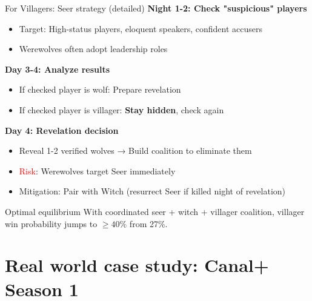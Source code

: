 \documentclass[10pt]{beamer}
\begin{document}
\begin{frame}{For Villagers: Seer strategy (detailed)}
  \textbf{Night 1-2: Check "suspicious" players}
  \begin{itemize}
    \item Target: High-status players, eloquent speakers, confident accusers
    \item Werewolves often adopt leadership roles
  \end{itemize}

  \vspace{0.3cm}
  \textbf{Day 3-4: Analyze results}
  \begin{itemize}
    \item If checked player is wolf: \alert{Prepare revelation}
    \item If checked player is villager: \textbf{Stay hidden}, check again
  \end{itemize}

  \vspace{0.3cm}
  \textbf{Day 4: Revelation decision}
  \begin{itemize}
    \item {Reveal 1-2 verified wolves} → Build coalition to eliminate them
    \item \textcolor{red}{Risk}: Werewolves target Seer immediately
    \item {Mitigation}: Pair with Witch (resurrect Seer if killed night of revelation)
  \end{itemize}

  \begin{alertblock}{Optimal equilibrium}
    With coordinated seer + witch + villager coalition, villager win probability jumps to $\geq 40\%$ from 27\%.
  \end{alertblock}
\end{frame}

\section{Real world case study: Canal+ Season 1}
\end{document}
